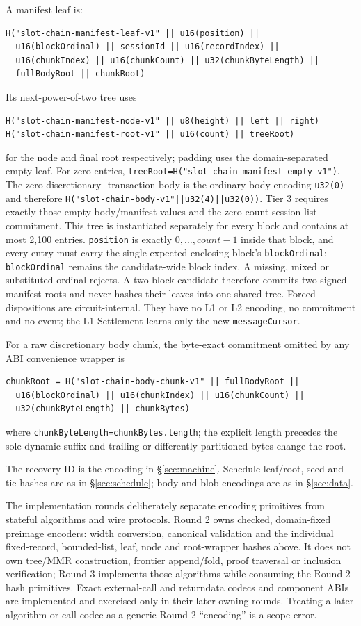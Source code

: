 \documentclass[a4paper,11pt]{article}
\newcommand{\code}[1]{\nolinkurl{#1}}
\begin{document}
A manifest leaf is:
\begin{verbatim}
H("slot-chain-manifest-leaf-v1" || u16(position) ||
  u16(blockOrdinal) || sessionId || u16(recordIndex) ||
  u16(chunkIndex) || u16(chunkCount) || u32(chunkByteLength) ||
  fullBodyRoot || chunkRoot)
\end{verbatim}
Its next-power-of-two tree uses
\begin{verbatim}
H("slot-chain-manifest-node-v1" || u8(height) || left || right)
H("slot-chain-manifest-root-v1" || u16(count) || treeRoot)
\end{verbatim}
for the node and final root respectively; padding uses the
domain-separated empty leaf.  For zero entries,
\code{treeRoot=H("slot-chain-manifest-empty-v1")}.  The zero-discretionary-
transaction body is the ordinary body encoding \code{u32(0)} and therefore
\code{H("slot-chain-body-v1"||u32(4)||u32(0))}.  Tier 3 requires exactly those
empty body/manifest values and the zero-count session-list commitment.
This tree is instantiated separately for every block and contains at most
2,100 entries.  \code{position} is exactly $0,\ldots,count-1$ inside that block,
and every entry must carry the single expected enclosing block's
\code{blockOrdinal}; \code{blockOrdinal} remains the candidate-wide block
index.  A missing, mixed or substituted ordinal rejects.  A two-block candidate
therefore commits two signed manifest roots and never hashes their leaves into
one shared tree.
Forced dispositions are circuit-internal.  They have no L1 or L2 encoding, no
commitment and no event; the L1 Settlement learns only the new
\code{messageCursor}.

For a raw discretionary body chunk, the byte-exact commitment omitted by any
ABI convenience wrapper is
\begin{verbatim}
chunkRoot = H("slot-chain-body-chunk-v1" || fullBodyRoot ||
  u16(blockOrdinal) || u16(chunkIndex) || u16(chunkCount) ||
  u32(chunkByteLength) || chunkBytes)
\end{verbatim}
where \code{chunkByteLength=chunkBytes.length}; the explicit length precedes
the sole dynamic suffix and trailing or differently partitioned bytes change
the root.

The recovery ID is the encoding in \S\ref{sec:machine}.  Schedule leaf/root,
seed and tie hashes are as in \S\ref{sec:schedule}; body and blob encodings are
as in \S\ref{sec:data}.

The implementation rounds deliberately separate encoding primitives from
stateful algorithms and wire protocols.  Round 2 owns checked,
domain-fixed preimage encoders: width conversion, canonical validation and the
individual fixed-record, bounded-list, leaf, node and root-wrapper hashes above.
It does not own tree/MMR construction, frontier append/fold, proof traversal or
inclusion verification; Round 3 implements those algorithms while consuming
the Round-2 hash primitives.  Exact external-call and returndata codecs and
component ABIs are implemented and exercised only in their later owning
rounds.  Treating a later algorithm
or call codec as a generic Round-2 ``encoding'' is a scope error.
\end{document}
